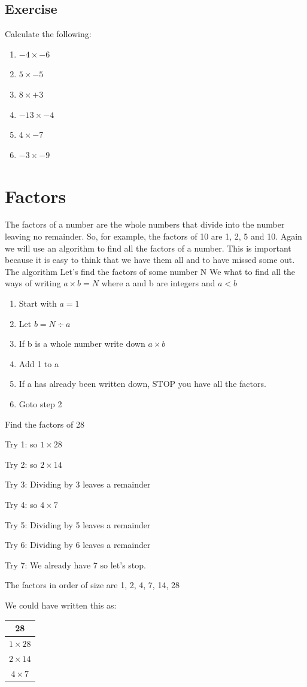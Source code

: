 \subsection{Exercise}
Calculate the following:
\begin{multicols}{2}
\begin{enumerate}
	\item $-4 \times -6$
	\item $5 \times -5$
	\item $8 \times +3$
	\item $-13 \times -4$
	\item $4 \times -7$
	\item $-3 \times -9$
\end{enumerate}
\end{multicols}
\section{Factors}
The factors of a number are the whole numbers that divide into the number leaving no remainder.  So, for example, the factors of 10 are 1, 2, 5 and 10.  Again we will use an algorithm to find all the factors of a number.  This is important because it is easy to think that we have them all and to have missed some out.
The algorithm
Let's find the factors of some number N
We what to find all the ways of writing $a \times b = N$ where a and b are integers and $a < b$
\begin{enumerate}
	\item Start with $a=1$
	\item Let $b = N \div a$
	\item If b is a whole number write down $a \times b$
	\item Add 1 to a
	\item If a has already been written down, STOP you have all the factors.
	\item Goto step 2
\end{enumerate}

\begin{exmp}
Find the factors of 28

Try 1: so $1 \times 28$

Try 2: so $2 \times 14$

Try 3: Dividing by 3 leaves a remainder

Try 4: so $4 \times 7$

Try 5: Dividing by 5 leaves a remainder

Try 6: Dividing by 6 leaves a remainder

Try 7: We already have 7 so let's stop.

The factors in order of size are 1, 2, 4, 7, 14, 28

We could have written this as:

\begin{tabular}{c}
28 \\
\hline
$1 \times 28$ \\
$2 \times 14$ \\
$4 \times 7$ \\
\end{tabular}
\end{exmp}

